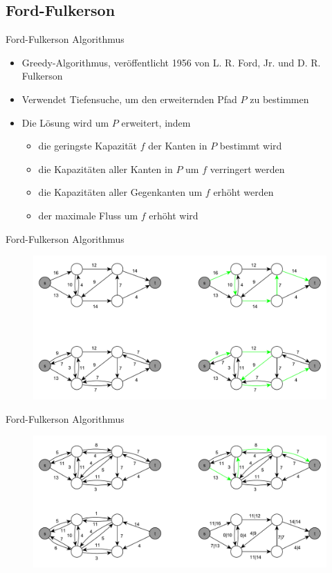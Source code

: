 \documentclass[18pt]{beamer}
\begin{document}
\subsection{Ford-Fulkerson}
\begin{frame}{Ford-Fulkerson Algorithmus}
\begin{itemize}
	\item Greedy-Algorithmus, ver\"offentlicht 1956 von L. R. Ford, Jr. und D. R. Fulkerson
	\item Verwendet Tiefensuche, um den erweiternden Pfad $P$ zu bestimmen
	\item Die L\"osung wird um $P$ erweitert, indem
	\begin{itemize}
		\pause
		\item die geringste Kapazit\"at $f$ der Kanten in $P$ bestimmt wird
		\pause
		\item die Kapazit\"aten aller Kanten in $P$ um $f$ verringert werden
		\pause
		\item die Kapazit\"aten aller Gegenkanten um $f$ erh\"oht werden
		\pause
		\item der maximale Fluss um $f$ erh\"oht wird
	\end{itemize}  
\end{itemize}
\end{frame}

\begin{frame}{Ford-Fulkerson Algorithmus}
\begin{figure}
\includegraphics[width = \textwidth]{img/Jakob_Ford.pdf}
\end{figure}
\end{frame}

\begin{frame}{Ford-Fulkerson Algorithmus}
\begin{figure}
	\includegraphics[width = \textwidth]{img/Jakob_Ford2.pdf}
\end{figure}
\end{frame}
\end{document}
